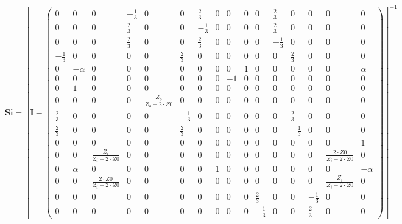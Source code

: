 \[ \mathbf{Si} =  \left[ \mathbf{I}  - \left(\begin{smallmatrix} 0 & 0 & 0 & -\frac{1}{3} & 0 & 0 & \frac{2}{3} & 0 & 0 & 0 & 0 & \frac{2}{3} & 0 & 0 & 0 & 0 \\ 0 & 0 & 0 & \frac{2}{3} & 0 & 0 & -\frac{1}{3} & 0 & 0 & 0 & 0 & \frac{2}{3} & 0 & 0 & 0 & 0 \\ 0 & 0 & 0 & \frac{2}{3} & 0 & 0 & \frac{2}{3} & 0 & 0 & 0 & 0 & -\frac{1}{3} & 0 & 0 & 0 & 0 \\ -\frac{1}{3} & 0 & 0 & 0 & 0 & \frac{2}{3} & 0 & 0 & 0 & 0 & 0 & 0 & \frac{2}{3} & 0 & 0 & 0 \\ 0 & -\alpha & 0 & 0 & 0 & 0 & 0 & 0 & 0 & 1 & 0 & 0 & 0 & 0 & 0 & \alpha \\ 0 & 0 & 0 & 0 & 0 & 0 & 0 & 0 & -1 & 0 & 0 & 0 & 0 & 0 & 0 & 0 \\ 0 & 1 & 0 & 0 & 0 & 0 & 0 & 0 & 0 & 0 & 0 & 0 & 0 & 0 & 0 & 0 \\ 0 & 0 & 0 & 0 & \frac{Z_o}{Z_o+2\cdot Z0} & 0 & 0 & 0 & 0 & 0 & 0 & 0 & 0 & 0 & 0 & 0 \\ \frac{2}{3} & 0 & 0 & 0 & 0 & -\frac{1}{3} & 0 & 0 & 0 & 0 & 0 & 0 & \frac{2}{3} & 0 & 0 & 0 \\ \frac{2}{3} & 0 & 0 & 0 & 0 & \frac{2}{3} & 0 & 0 & 0 & 0 & 0 & 0 & -\frac{1}{3} & 0 & 0 & 0 \\ 0 & 0 & 0 & 0 & 0 & 0 & 0 & 0 & 0 & 0 & 0 & 0 & 0 & 0 & 0 & 1 \\ 0 & 0 & \frac{Z_i}{Z_i+2\cdot Z0} & 0 & 0 & 0 & 0 & 0 & 0 & 0 & 0 & 0 & 0 & 0 & \frac{2\cdot Z0}{Z_i+2\cdot Z0} & 0 \\ 0 & \alpha & 0 & 0 & 0 & 0 & 0 & 1 & 0 & 0 & 0 & 0 & 0 & 0 & 0 & -\alpha \\ 0 & 0 & \frac{2\cdot Z0}{Z_i+2\cdot Z0} & 0 & 0 & 0 & 0 & 0 & 0 & 0 & 0 & 0 & 0 & 0 & \frac{Z_i}{Z_i+2\cdot Z0} & 0 \\ 0 & 0 & 0 & 0 & 0 & 0 & 0 & 0 & 0 & 0 & \frac{2}{3} & 0 & 0 & -\frac{1}{3} & 0 & 0 \\ 0 & 0 & 0 & 0 & 0 & 0 & 0 & 0 & 0 & 0 & -\frac{1}{3} & 0 & 0 & \frac{2}{3} & 0 & 0 \end{smallmatrix}\right) \right]^{-1}  \]
